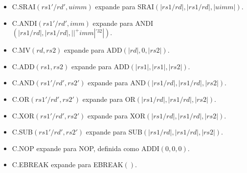 \begin{itemize}
  \item C.SRAI$(rs1'/rd', uimm)$ expande para SRAI$(|rs1/rd|, |rs1/rd|, |uimm|)$.
  \item C.ANDI$(rs1'/rd', imm)$ expande para ANDI$(|rs1/rd|, |rs1/rd|, ||^+imm|^{'32}|)$.
  \item C.MV$(rd, rs2)$ expande para ADD$(|rd|, 0, |rs2|)$.
  \item C.ADD$(rs1, rs2)$ expande para ADD$(|rs1|, |rs1|, |rs2|)$.
  \item C.AND$(rs1'/rd', rs2')$ expande para AND$(|rs1/rd|, |rs1/rd|, |rs2|)$.
  \item C.OR$(rs1'/rd', rs2')$ expande para OR$(|rs1/rd|, |rs1/rd|, |rs2|)$.
  \item C.XOR$(rs1'/rd', rs2')$ expande para XOR$(|rs1/rd|, |rs1/rd|, |rs2|)$.
  \item C.SUB$(rs1'/rd', rs2')$ expande para SUB$(|rs1/rd|, |rs1/rd|, |rs2|)$.
  \item C.NOP expande para NOP, definida como ADDI$(0,0,0)$.
  \item C.EBREAK expande para EBREAK$()$.
  \end{itemize}

